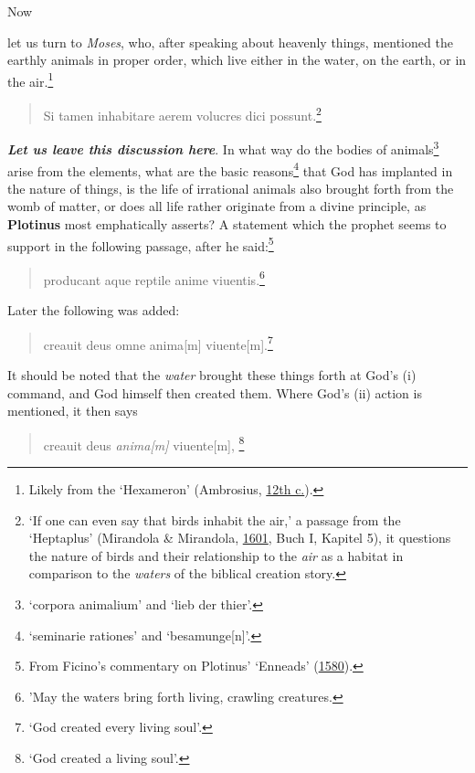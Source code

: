 \documentclass[
]{article}
\begin{document}
Now

let us turn to \emph{Moses}, who, after speaking about heavenly things,
mentioned the earthly animals in proper order, which live either in the
water, on the earth, or in the air.\footnote{Likely from the `Hexameron'
  (Ambrosius,
  \href{https://mdz-nbn-resolving.de/details:bsb00046506}{12th c.}).}

\begin{quote}
Si tamen inhabitare aerem volucres dici possunt.\footnote{`If one can
  even say that birds inhabit the air,' a passage from the `Heptaplus'
  (Mirandola \& Mirandola,
  \href{https://doi.org/10.3931/e-rara-61217}{1601}, Buch I, Kapitel 5),
  it questions the nature of birds and their relationship to the
  \emph{air} as a habitat in comparison to the \emph{waters} of the
  biblical creation story.}
\end{quote}

\textbf{\emph{Let us leave this discussion here}}. In what way do the
bodies of animals\footnote{`corpora animalium' and `lieb der thier'.}
arise from the elements, what are the basic reasons\footnote{`seminarie
  rationes' and `besamunge{[}n{]}'.} that God has implanted in the
nature of things, is the life of irrational animals also brought forth
from the womb of matter, or does all life rather originate from a divine
principle, as \textbf{Plotinus} most emphatically asserts? A statement
which the prophet seems to support in the following passage, after he
said:\footnote{From Ficino's commentary on Plotinus' `Enneads'
  (\href{https://doi.org/10.3931/e-rara-120889}{1580}).}

\begin{quote}
producant aque reptile anime viuentis.\footnote{'May the waters bring
  forth living, crawling creatures.}
\end{quote}

Later the following was added:

\begin{quote}
creauit deus omne anima{[}m{]} viuente{[}m{]}.\footnote{`God created
  every living soul'.}
\end{quote}

It should be noted that the \emph{water} brought these things forth at
God's (i) command, and God himself then created them. Where God's (ii)
action is mentioned, it then says

\begin{quote}
creauit deus \emph{anima{[}m{]}} viuente{[}m{]}, \footnote{`God created
  a living soul'.}
\end{quote}
\end{document}
